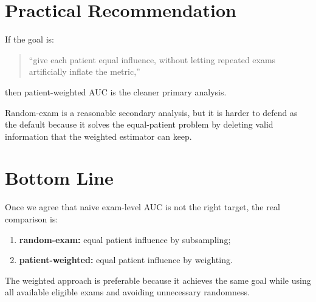 \documentclass[11pt]{article}
\begin{document}
\section*{Practical Recommendation}
If the goal is:
\begin{quote}
``give each patient equal influence, without letting repeated exams artificially inflate the metric,''
\end{quote}
then patient-weighted AUC is the cleaner primary analysis.

Random-exam is a reasonable secondary analysis, but it is harder to defend as the default because it solves the equal-patient problem by deleting valid information that the weighted estimator can keep.

\section*{Bottom Line}
Once we agree that naive exam-level AUC is not the right target, the real comparison is:
\begin{enumerate}[leftmargin=2em]
\item \textbf{random-exam:} equal patient influence by subsampling;
\item \textbf{patient-weighted:} equal patient influence by weighting.
\end{enumerate}

The weighted approach is preferable because it achieves the same goal while using all available eligible exams and avoiding unnecessary randomness.
\end{document}
